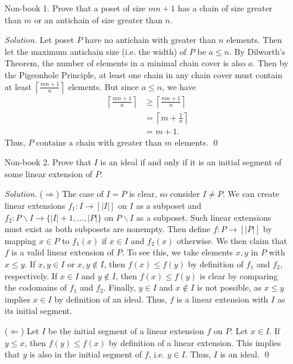 \documentclass[11pt,letterpaper]{article}
\newenvironment{solution}{\color{Violet}\textit{Solution.}}{\color{black}}
\begin{document}
\begin{enumerate}
\begin{solution}
    \end{solution}

    \item[Non-book 1.] Prove that a poset of size $mn+1$ has a chain of size greater than $m$ or an antichain of size greater than $n$.
    
    \begin{solution}
        Let poset $P$ have no antichain with greater than $n$ elements. Then let the maximum antichain size (i.e. the width) of $P$ be $a\leq n$. By Dilworth's Theorem, the number of elements in a minimal chain cover is also $a$. Then by the Pigeonhole Principle, at least one chain in any chain cover must contain at least $\left\lceil \frac{mn+1}{a} \right\rceil$ elements. But since $a\leq n$, we have 
		\begin{align*}
			\left\lceil \frac{mn+1}{a} \right\rceil &\geq 
            \left\lceil \frac{mn+1}{n} \right\rceil \\ &= 
            \left\lceil m+\frac{1}{n} \right\rceil \\
			&= m+1.
		\end{align*}
		Thus, $P$ contains a chain with greater than $m$ elements. \qed
    \end{solution}
    
    \item[Non-book 2.] Prove that $I$ is an ideal if and only if it is an initial segment of some linear extension of $P$. 
    
    \begin{solution}
        ($\Rightarrow$) The case of $I=P$ is clear, so consider $I \neq P$. We can create linear extensions $f_1\colon I \rightarrow [|I|]$ on $I$ as a subposet and $f_2\colon P\backslash I \rightarrow \{|I|+1,\dots,|P|\}$ on $P\backslash I$ as a subposet. Such linear extensions must exist as both subposets are nonempty. Then define $f\colon P \rightarrow [|P|]$ by mapping $x\in P$ to $f_1(x)$ if $x\in I$ and $f_2(x)$ otherwise. We then claim that $f$ is a valid linear extension of $P$. To see this, we take elements $x,y$ in $P$ with $x\leq y$. If $x,y\in I$ or $x,y\notin I$, then $f(x)\leq f(y)$ by definition of $f_1$ and $f_2$, respectively. If $x\in I$ and $y \notin I$, then $f(x)\leq f(y)$ is clear by comparing the codomains of $f_1$ and $f_2$. Finally, $y \in I$ and $x \notin I$ is not possible, as $x\leq y$ implies $x \in I$ by definition of an ideal. Thus, $f$ is a linear extension with $I$ as its initial segment.

        ($\Leftarrow$) Let $I$ be the initial segment of a linear extension $f$ on $P$. Let $x\in I$. If $y \leq x$, then $f(y) \leq f(x)$ by definition of a linear extension. This implies that $y$ is also in the initial segment of $f$, i.e. $y \in I$. Thus, $I$ is an ideal. \qed
    \end{solution}
    

\end{enumerate}
\end{document}

